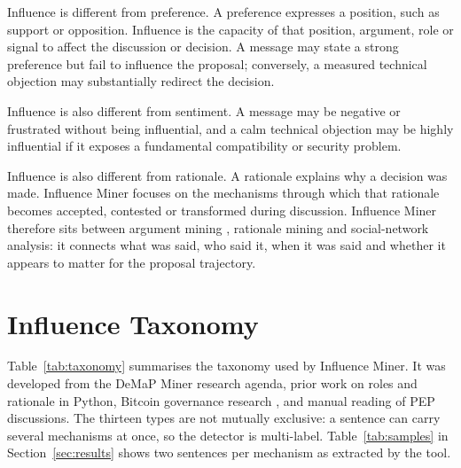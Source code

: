 \documentclass[sigconf,screen]{acmart}
\begin{document}
Influence is different from preference. A preference expresses a position, such as support or opposition. Influence is the capacity of that position, argument, role or signal to affect the discussion or decision. A message may state a strong preference but fail to influence the proposal; conversely, a measured technical objection may substantially redirect the decision.

Influence is also different from sentiment. A message may be negative or frustrated without being influential, and a calm technical objection may be highly influential if it exposes a fundamental compatibility or security problem.

Influence is also different from rationale. A rationale explains why a decision was made. Influence Miner focuses on the mechanisms through which that rationale becomes accepted, contested or transformed during discussion. Influence Miner therefore sits between argument mining \cite{argumentMining}, rationale mining and social-network analysis: it connects what was said, who said it, when it was said and whether it appears to matter for the proposal trajectory.

\section{Influence Taxonomy}

Table~\ref{tab:taxonomy} summarises the taxonomy used by Influence Miner. It was developed from the DeMaP Miner research agenda, prior work on roles and rationale in Python, Bitcoin governance research \cite{thapa2021bitcoin}, and manual reading of PEP discussions. The thirteen types are not mutually exclusive: a sentence can carry several mechanisms at once, so the detector is multi-label. Table~\ref{tab:samples} in Section~\ref{sec:results} shows two sentences per mechanism as extracted by the tool.
\end{document}
